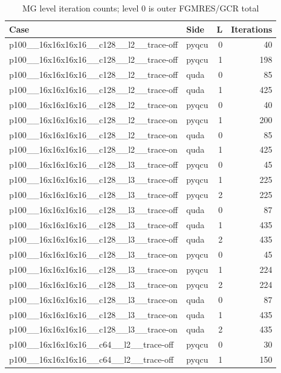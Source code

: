 \begin{table}[htbp]
\centering
\caption{MG level iteration counts; level 0 is outer FGMRES/GCR total}
\small
\begin{tabular}{@{}llrr@{}}
\toprule
Case & Side & L & Iterations \\
\midrule
p100\_\_16x16x16x16\_\_c128\_\_l2\_\_trace-off & pyqcu & 0 & 40 \\
p100\_\_16x16x16x16\_\_c128\_\_l2\_\_trace-off & pyqcu & 1 & 198 \\
p100\_\_16x16x16x16\_\_c128\_\_l2\_\_trace-off & quda & 0 & 85 \\
p100\_\_16x16x16x16\_\_c128\_\_l2\_\_trace-off & quda & 1 & 425 \\
p100\_\_16x16x16x16\_\_c128\_\_l2\_\_trace-on & pyqcu & 0 & 40 \\
p100\_\_16x16x16x16\_\_c128\_\_l2\_\_trace-on & pyqcu & 1 & 200 \\
p100\_\_16x16x16x16\_\_c128\_\_l2\_\_trace-on & quda & 0 & 85 \\
p100\_\_16x16x16x16\_\_c128\_\_l2\_\_trace-on & quda & 1 & 425 \\
p100\_\_16x16x16x16\_\_c128\_\_l3\_\_trace-off & pyqcu & 0 & 45 \\
p100\_\_16x16x16x16\_\_c128\_\_l3\_\_trace-off & pyqcu & 1 & 225 \\
p100\_\_16x16x16x16\_\_c128\_\_l3\_\_trace-off & pyqcu & 2 & 225 \\
p100\_\_16x16x16x16\_\_c128\_\_l3\_\_trace-off & quda & 0 & 87 \\
p100\_\_16x16x16x16\_\_c128\_\_l3\_\_trace-off & quda & 1 & 435 \\
p100\_\_16x16x16x16\_\_c128\_\_l3\_\_trace-off & quda & 2 & 435 \\
p100\_\_16x16x16x16\_\_c128\_\_l3\_\_trace-on & pyqcu & 0 & 45 \\
p100\_\_16x16x16x16\_\_c128\_\_l3\_\_trace-on & pyqcu & 1 & 224 \\
p100\_\_16x16x16x16\_\_c128\_\_l3\_\_trace-on & pyqcu & 2 & 224 \\
p100\_\_16x16x16x16\_\_c128\_\_l3\_\_trace-on & quda & 0 & 87 \\
p100\_\_16x16x16x16\_\_c128\_\_l3\_\_trace-on & quda & 1 & 435 \\
p100\_\_16x16x16x16\_\_c128\_\_l3\_\_trace-on & quda & 2 & 435 \\
p100\_\_16x16x16x16\_\_c64\_\_l2\_\_trace-off & pyqcu & 0 & 30 \\
p100\_\_16x16x16x16\_\_c64\_\_l2\_\_trace-off & pyqcu & 1 & 150 \\

\end{tabular}
\end{table}
